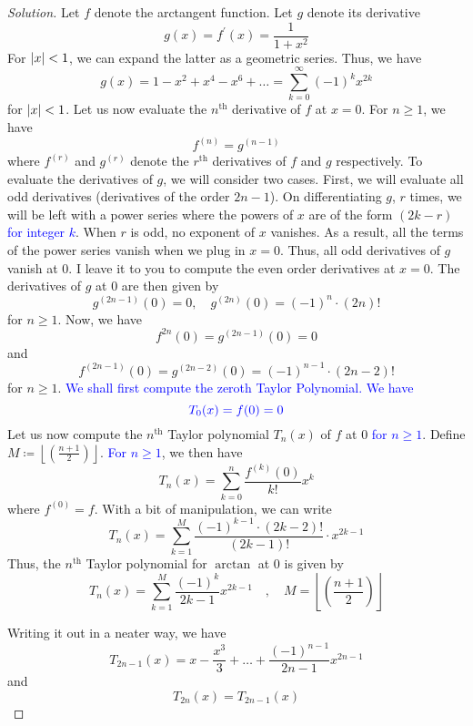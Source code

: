 \documentclass[12pt]{article}
\theoremstyle{definition}
\newenvironment{soln}{\begin{proof}[Solution]}{\end{proof}}
\begin{document}
\begin{enumerate}[leftmargin=*]
    \begin{soln}
        Let $f$ denote the arctangent function. Let $g$ denote its derivative
        \[
            g(x) = f^{\prime}(x) = \frac{1}{1+x^2}
        \]
        For $\abs{x} < 1$, we can expand the latter as a geometric series. Thus, we have
        \[
            g(x) = 1 - x^2 + x^4 - x^6 + \ldots = \sum_{k=0}^{\infty} (-1)^k x^{2k}
        \]
        for $\abs{x} < 1$. Let us now evaluate the $n^{\text{th}}$ derivative of $f$ at $x=0$. For $n \geq 1$, we have
        \[
            f^{(n)} = g^{(n-1)}
        \]
        where $f^{(r)}$ and $g^{(r)}$ denote the $r^{\text{th}}$ derivatives of $f$ and $g$ respectively. To evaluate the derivatives of $g$, we will consider two cases. First, we will evaluate all odd derivatives (derivatives of the order $2n-1$). On differentiating $g$, $r$ times, we will be left with a power series where the powers of $x$ are of the form $(2k-r)$ \textcolor{blue}{for integer $k$}. When $r$ is odd, no exponent of $x$ vanishes. As a result, all the terms of the power series vanish when we plug in $x=0$. Thus, all odd derivatives of $g$ vanish at $0$. I leave it to you to compute the even order derivatives at $x=0$. The derivatives of $g$ at $0$ are then given by
        \[
            g^{(2n-1)}(0) = 0, \quad g^{(2n)}(0) = (-1)^n \cdot (2n)!
        \]
        for $n \geq 1$. Now, we have
        \[
            f^{2n}(0) = g^{(2n-1)}(0) = 0
        \]
        and
        \[
            f^{(2n-1)}(0) = g^{(2n-2)}(0) = (-1)^{n-1} \cdot (2n-2)!
        \]
        for $n \geq 1$. \textcolor{blue}{We shall first compute the zeroth Taylor Polynomial. We have}
        \[
            \textcolor{blue}{T_0(x) = f(0) = 0}
        \]  
        Let us now compute the $n^{\text{th}}$ Taylor polynomial $T_n(x)$ of $f$ at $0$ \textcolor{blue}{for $n \geq 1$}. Define $M \coloneqq \left\lfloor \left( \frac{n+1}{2} \right)  \right\rfloor$.   \textcolor{blue}{ For $n \geq 1$}, we then have
        \[
            T_n(x) = \sum_{k=0}^{n} \frac{f^{(k)}(0)}{k!} x^k
        \]
        where $f^{(0)} = f$. With a bit of manipulation, we can write 
        \[
            T_n(x) = \sum_{k=1}^{M} \frac{(-1)^{k-1} \cdot (2k-2)!}{(2k-1)!} \cdot x^{2k-1}
        \]  
        Thus, the $n^{\text{th}}$ Taylor polynomial for $\arctan$ at $0$ is given by
        \[
            T_n(x) = \sum_{k=1}^{M} \frac{(-1)^k}{2k-1} x^{2k-1} \quad , \quad M = \left\lfloor \left( \frac{n+1}{2} \right) \right\rfloor
        \]
        
        Writing it out in a neater way, we have
        \[
            T_{2n-1}(x) = x - \frac{x^3}{3} + \ldots + \frac{(-1)^{n-1}}{2n-1} x^{2n-1} 
        \]
        and 
        \[
            T_{2n}(x) = T_{2n-1}(x)
        \]
        

\end{soln}
\end{enumerate}
\end{document}
